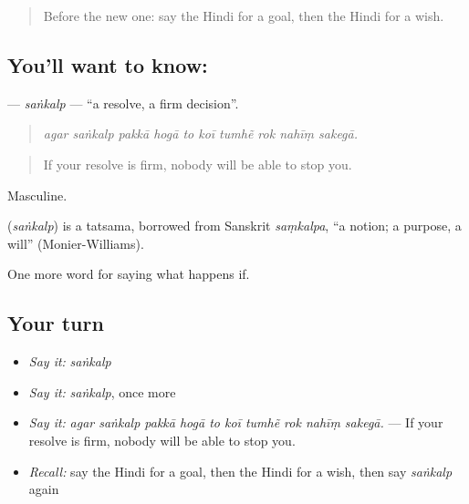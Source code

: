 \label{lesson:HI-C390-sankalp}



\begin{quote}
Before the new one: say the Hindi for a goal, then the Hindi for a wish.
\end{quote}

\subsection*{You'll want to know: }
\textbf{} — \emph{saṅkalp} — \textquotedblleft{}a resolve, a firm decision\textquotedblright{}.

\begin{quote}
         
\end{quote}

\begin{quote}
\emph{agar saṅkalp pakkā hogā to koī tumhẽ rok nahīṃ sakegā.}
\end{quote}

\begin{quote}
If your resolve is firm, nobody will be able to stop you.
\end{quote}

Masculine.

\begin{cousinweb}
\textbf{} (\emph{saṅkalp}) is a tatsama, borrowed from Sanskrit \emph{saṃkalpa}, \textquotedblleft{}a notion; a purpose, a will\textquotedblright{} (Monier-Williams).
\end{cousinweb}

\begin{grammarlens}[title={What you've built}]
One more word for saying what happens if.
\end{grammarlens}

\subsection*{Your turn}
\begin{itemize}
\raggedright
  \item \emph{Say it:} \emph{saṅkalp}
  \item \emph{Say it:} \emph{saṅkalp}, once more
  \item \emph{Say it:} \emph{agar saṅkalp pakkā hogā to koī tumhẽ rok nahīṃ sakegā.} — If your resolve is firm, nobody will be able to stop you.
  \item \emph{Recall:} say the Hindi for a goal, then the Hindi for a wish, then say \emph{saṅkalp} again
\end{itemize}

